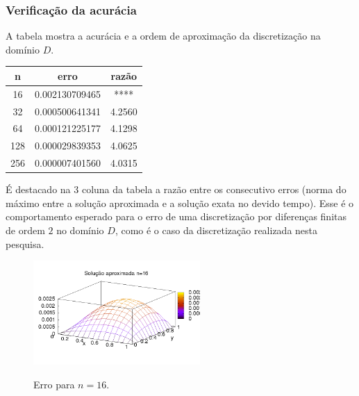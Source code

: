 \documentclass[a4paper]{article} %
\begin{document}
\subsubsection{Verificação da acurácia}

A tabela mostra a acurácia e a ordem de aproximação da discretização na domínio $D$.

\begin{table}[!h]
\begin{tabular}{|c|c|c|}
\hline
	n & erro& razão\\
\hline
	16 & 0.002130709465& ****\\
\hline
	32 &0.000500641341&    4.2560 \\
\hline
	64 &0.000121225177     &   4.1298  \\
\hline
128	 &   0.000029839353  &    4.0625 \\
\hline
256	 &   0.000007401560  &  4.0315   \\
\hline
\end{tabular}
\end{table}

É destacado na 3 coluna da tabela a razão entre os consecutivo erros (norma do máximo entre a solução aproximada e a solução exata no devido tempo). Esse é o comportamento esperado para o erro de uma discretização por diferenças finitas de ordem $2$ no domínio $D$, como é o caso da discretização realizada nesta pesquisa. 


\begin{figure}[!htb]
\centering
\includegraphics[width=2.5in]{erro_n_16.png}
\label{fig5}
\caption{Erro para $n=16$.}
\end{figure}
\end{document}
